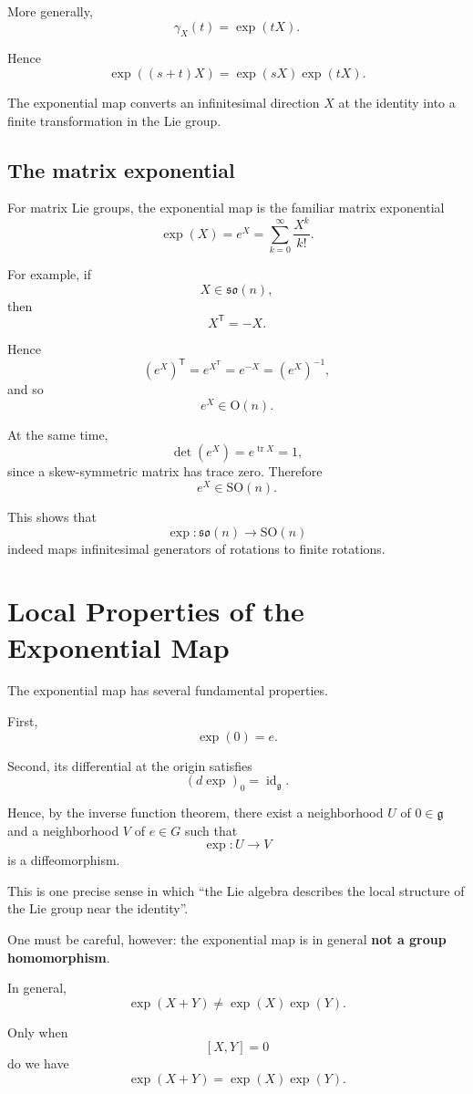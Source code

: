 \documentclass[11pt]{article}
\begin{document}
More generally,
\[
\gamma_X(t)
=
\exp(tX).
\]

Hence
\[
\exp((s+t)X)
=
\exp(sX)\exp(tX).
\]

The exponential map converts an infinitesimal direction $X$ at the identity into a finite transformation in the Lie group.


\subsection{The matrix exponential}

For matrix Lie groups, the exponential map is the familiar matrix exponential
\[
\exp(X)
=
e^X
=
\sum_{k=0}^{\infty}\frac{X^k}{k!}.
\]

For example, if
\[
X\in\mathfrak{so}(n),
\]
then
\[
X^{\mathsf T}=-X.
\]

Hence
\[
(e^X)^{\mathsf T}
=
e^{X^{\mathsf T}}
=
e^{-X}
=
(e^X)^{-1},
\]
and so
\[
e^X\in\mathrm{O}(n).
\]

At the same time,
\[
\det(e^X)
=
e^{\operatorname{tr}X}
=
1,
\]
since a skew-symmetric matrix has trace zero. Therefore
\[
e^X\in\mathrm{SO}(n).
\]

This shows that
\[
\exp:
\mathfrak{so}(n)
\to
\mathrm{SO}(n)
\]
indeed maps infinitesimal generators of rotations to finite rotations.


\section{Local Properties of the Exponential Map}

The exponential map has several fundamental properties.

First,
\[
\exp(0)=e.
\]

Second, its differential at the origin satisfies
\[
(d\exp)_0
=
\operatorname{id}_{\mathfrak g}.
\]

Hence, by the inverse function theorem, there exist a neighborhood $U$ of $0\in\mathfrak g$ and a neighborhood $V$ of $e\in G$ such that
\[
\exp:U\to V
\]
is a diffeomorphism.

This is one precise sense in which ``the Lie algebra describes the local structure of the Lie group near the identity''.

One must be careful, however: the exponential map is in general \textbf{not a group homomorphism}.

In general,
\[
\exp(X+Y)
\neq
\exp(X)\exp(Y).
\]

Only when
\[
[X,Y]=0
\]
do we have
\[
\exp(X+Y)
=
\exp(X)\exp(Y).
\]
\end{document}
